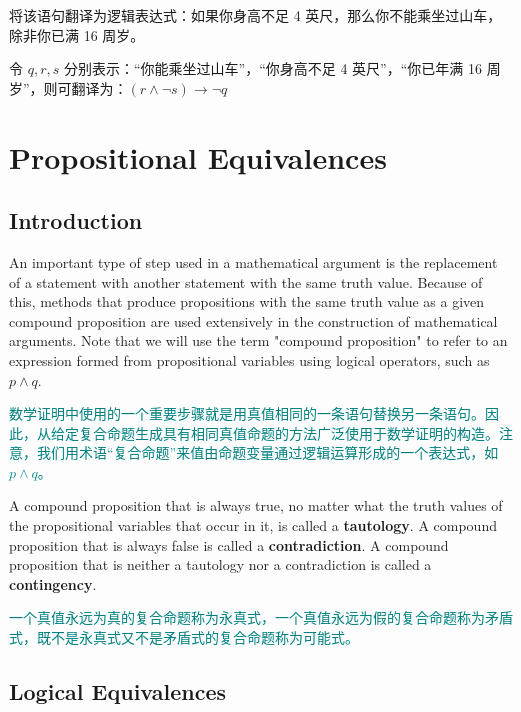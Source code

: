 \documentclass[12pt, a4paper]{article} %
\begin{document}
\begin{example}
    将该语句翻译为逻辑表达式：如果你身高不足 4 英尺，那么你不能乘坐过山车，除非你已满 16 周岁。
\end{example}

令 $q, r, s$ 分别表示：“你能乘坐过山车”，“你身高不足 4 英尺”，“你已年满 16 周岁”，则可翻译为：$(r \wedge \neg s) \to \neg q$

\section{Propositional Equivalences}
\subsection{Introduction}

An important type of step used in a mathematical argument is the replacement of a statement with another statement with the same truth value.
Because of this, methods that produce propositions with the same truth value as a given compound proposition are used extensively in the construction of mathematical arguments.
Note that we will use the term "compound proposition" to refer to an expression formed from propositional variables using logical operators, such as $p \wedge q$.

\textcolor{teal}{
    数学证明中使用的一个重要步骤就是用真值相同的一条语句替换另一条语句。因此，从给定复合命题生成具有相同真值命题的方法广泛使用于数学证明的构造。注意，我们用术语“复合命题”来值由命题变量通过逻辑运算形成的一个表达式，如 $p \wedge q$。
}

\begin{definition}
    A compound proposition that is always true, no matter what the truth values of the propositional variables that occur in it, is called a \textbf{tautology}.
    A compound proposition that is always false is called a \textbf{contradiction}.
    A compound proposition that is neither a tautology nor a contradiction is called a \textbf{contingency}.
\end{definition}

\begin{theorem}
    \textcolor{teal}{
        一个真值永远为真的复合命题称为永真式，一个真值永远为假的复合命题称为矛盾式，既不是永真式又不是矛盾式的复合命题称为可能式。
    }
\end{theorem}

\subsection{Logical Equivalences}
\end{document}

